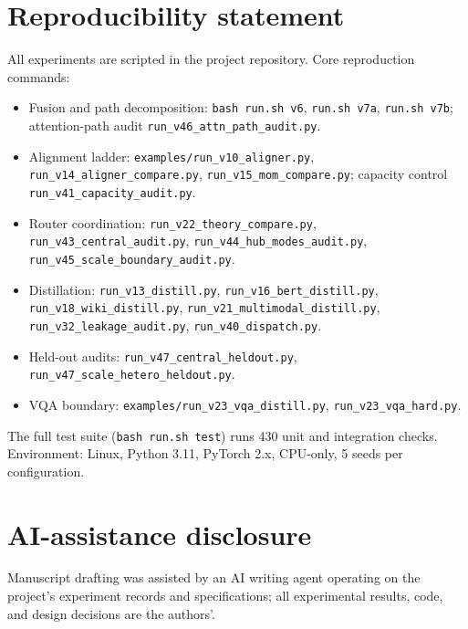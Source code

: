 \documentclass[10pt]{article}
\theoremstyle{definition}
\theoremstyle{plain}
\theoremstyle{remark}
\begin{document}
\section*{Reproducibility statement}
\label{sec:repro}

All experiments are scripted in the project repository. Core reproduction commands:

\begin{itemize}[leftmargin=1.6em, itemsep=0.5pt, parsep=0pt]
    \item Fusion and path decomposition: \texttt{bash run.sh v6}, \texttt{run.sh v7a}, \texttt{run.sh v7b}; attention-path audit \texttt{run\_v46\_attn\_path\_audit.py}.
    \item Alignment ladder: \texttt{examples/run\_v10\_aligner.py}, \texttt{run\_v14\_aligner\_compare.py}, \texttt{run\_v15\_mom\_compare.py}; capacity control \texttt{run\_v41\_capacity\_audit.py}.
    \item Router coordination: \texttt{run\_v22\_theory\_compare.py}, \texttt{run\_v43\_central\_audit.py}, \texttt{run\_v44\_hub\_modes\_audit.py}, \texttt{run\_v45\_scale\_boundary\_audit.py}.
    \item Distillation: \texttt{run\_v13\_distill.py}, \texttt{run\_v16\_bert\_distill.py}, \texttt{run\_v18\_wiki\_distill.py}, \texttt{run\_v21\_multimodal\_distill.py}, \texttt{run\_v32\_leakage\_audit.py}, \texttt{run\_v40\_dispatch.py}.
    \item Held-out audits: \texttt{run\_v47\_central\_heldout.py}, \texttt{run\_v47\_scale\_hetero\_heldout.py}.
    \item VQA boundary: \texttt{examples/run\_v23\_vqa\_distill.py}, \texttt{run\_v23\_vqa\_hard.py}.
\end{itemize}

The full test suite (\texttt{bash run.sh test}) runs 430 unit and integration checks. Environment: Linux, Python 3.11, PyTorch 2.x, CPU-only, 5 seeds per configuration.

\section*{AI-assistance disclosure}

Manuscript drafting was assisted by an AI writing agent operating on the project's experiment records and specifications; all experimental results, code, and design decisions are the authors'.



\end{document}
